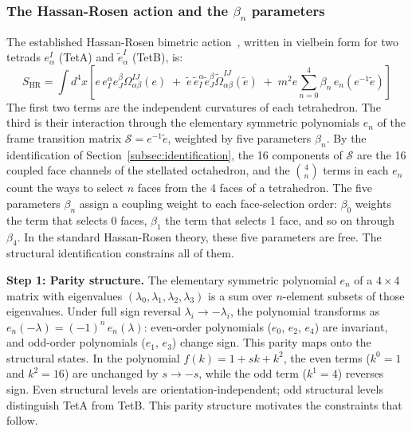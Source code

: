 \documentclass[aps,prd,preprint,superscriptaddress,showpacs,preprintnumbers,amsmath,amssymb,nofootinbib]{revtex4-2}
\begin{document}
\subsubsection*{The Hassan-Rosen action and the $\beta_n$ parameters}

The established Hassan-Rosen bimetric action~\cite{hassan2012}, written in vielbein form for two tetrads $e^I_\alpha$ (TetA) and $\tilde{e}^I_\alpha$ (TetB), is:
\begin{equation}
S_{\text{HR}} = \int d^4x \left[ e\, e_I^\alpha e_J^\beta \Omega^{IJ}_{\alpha\beta}(e) \;+\; \tilde{e}\, \tilde{e}_I^\alpha \tilde{e}_J^\beta \tilde{\Omega}^{IJ}_{\alpha\beta}(\tilde{e}) \;+\; m^2 e \sum_{n=0}^{4} \beta_n \, e_n(e^{-1}\tilde{e}) \right]
\label{eq:hassan-rosen}
\end{equation}
The first two terms are the independent curvatures of each tetrahedron. The third is their interaction through the elementary symmetric polynomials $e_n$ of the frame transition matrix $\mathcal{S} = e^{-1}\tilde{e}$, weighted by five parameters $\beta_n$. By the identification of Section~\ref{subsec:identification}, the 16 components of $\mathcal{S}$ are the 16 coupled face channels of the stellated octahedron, and the $\binom{4}{n}$ terms in each $e_n$ count the ways to select $n$ faces from the 4 faces of a tetrahedron. The five parameters $\beta_n$ assign a coupling weight to each face-selection order: $\beta_0$ weights the term that selects 0 faces, $\beta_1$ the term that selects 1 face, and so on through $\beta_4$. In the standard Hassan-Rosen theory, these five parameters are free. The structural identification constrains all of them.

\textbf{Step 1: Parity structure.} The elementary symmetric polynomial $e_n$ of a $4 \times 4$ matrix with eigenvalues $(\lambda_0, \lambda_1, \lambda_2, \lambda_3)$ is a sum over $n$-element subsets of those eigenvalues. Under full sign reversal $\lambda_i \to -\lambda_i$, the polynomial transforms as $e_n(-\lambda) = (-1)^n\,e_n(\lambda)$: even-order polynomials ($e_0$, $e_2$, $e_4$) are invariant, and odd-order polynomials ($e_1$, $e_3$) change sign. This parity maps onto the structural states. In the polynomial $f(k) = 1 + sk + k^2$, the even terms ($k^0 = 1$ and $k^2 = 16$) are unchanged by $s \to -s$, while the odd term ($k^1 = 4$) reverses sign. Even structural levels are orientation-independent; odd structural levels distinguish TetA from TetB. This parity structure motivates the constraints that follow.
\end{document}
